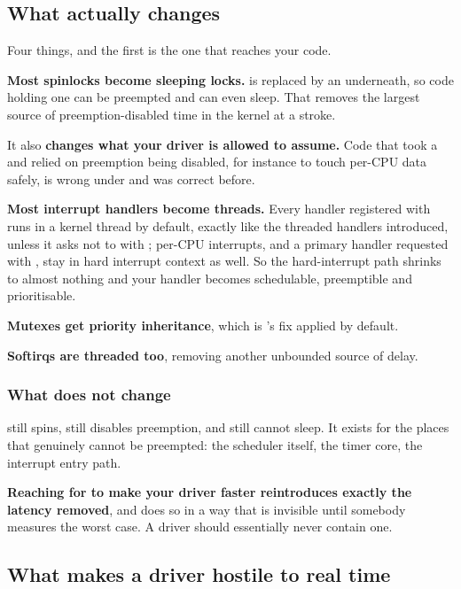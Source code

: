\subsection{What  actually changes}
\label{c12:app:a5}

Four things, and the first is the one that reaches your code.

\textbf{Most spinlocks become sleeping locks.}  is replaced by an 
underneath, so code holding one can be preempted and can even sleep. That removes the largest source
of preemption-disabled time in the kernel at a stroke.

It also \textbf{changes what your driver is allowed to assume.} Code that took a 
and relied on preemption being disabled, for instance to touch per-CPU data safely, is wrong under
 and was correct before.

\textbf{Most interrupt handlers become threads.} Every handler registered with 
runs in a kernel thread by default, exactly like the threaded handlers 
introduced, unless it asks not to with ; per-CPU interrupts, and a primary
handler requested with , stay in hard interrupt context as well. So the
hard-interrupt path shrinks to almost nothing and your handler becomes schedulable, preemptible and
prioritisable.

\textbf{Mutexes get priority inheritance}, which is 's fix applied by default.

\textbf{Softirqs are threaded too}, removing another unbounded source of delay.

\subsubsection{What does not change}
\label{c12:app:a:what-does-not-change}

 still spins, still disables preemption, and still cannot sleep. It exists for
the places that genuinely cannot be preempted: the scheduler itself, the timer core, the interrupt
entry path.

\textbf{Reaching for  to make your driver faster reintroduces exactly the
latency  removed}, and does so in a way that is invisible until somebody measures
the worst case. A driver should essentially never contain one.

\subsection{What makes a driver hostile to real time}
\label{c12:app:a6}

